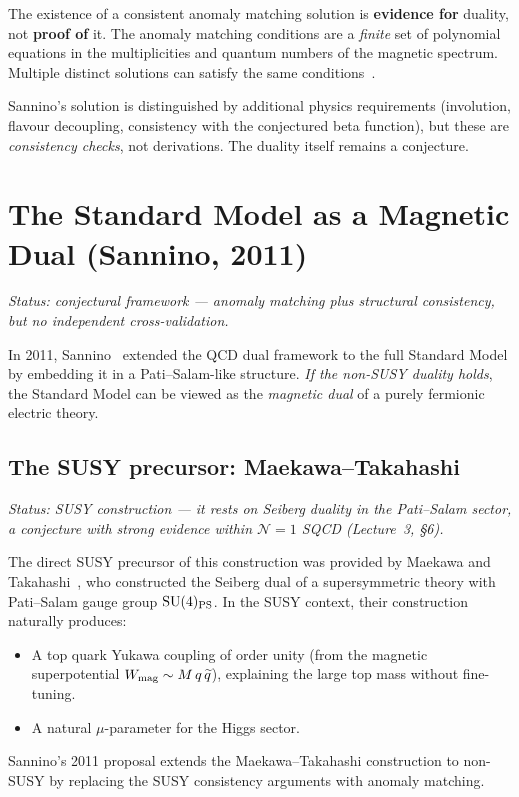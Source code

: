 \documentclass[11pt,a4paper]{article}
\begin{document}
\begin{warningbox}[title={Anomaly matching is necessary but not sufficient}]
  The existence of a consistent anomaly matching solution is
  \textbf{evidence for} duality, not \textbf{proof of} it.  The
  anomaly matching conditions are a \emph{finite} set of polynomial
  equations in the multiplicities and quantum numbers of the magnetic
  spectrum.  Multiple distinct solutions can satisfy the same
  conditions~\cite{Sannino2009}.

  \medskip

  Sannino's solution is distinguished by additional
  physics requirements (involution, flavour decoupling, consistency
  with the conjectured beta function), but these are
  \emph{consistency checks}, not derivations.  The duality itself
  remains a conjecture.
\end{warningbox}


\section{The Standard Model as a Magnetic Dual (Sannino, 2011)}
\label{sec:sm-magnetic}

\textit{Status: conjectural framework --- anomaly matching plus structural consistency, but no independent cross-validation.}

In 2011, Sannino~\cite{Sannino2011} extended the QCD dual framework
to the full Standard Model by embedding it in a Pati--Salam-like
structure.  \emph{If the non-SUSY duality holds}, the Standard Model
can be viewed as the \emph{magnetic dual} of a purely fermionic
electric theory.

\subsection{The SUSY precursor: Maekawa--Takahashi}

\textit{Status: SUSY construction --- it rests on Seiberg duality in the Pati--Salam sector, a conjecture with strong evidence within $\mathcal{N}=1$ SQCD (Lecture~3, \S6).}

The direct SUSY precursor of this construction was provided by
Maekawa and Takahashi~\cite{MT1996}, who constructed the Seiberg dual
of a supersymmetric theory with Pati--Salam gauge group
$\mathrm{SU}(4)_{\mathrm{PS}}$.  In the SUSY context, their construction
naturally produces:
\begin{itemize}
  \item A top quark Yukawa coupling of order unity (from the magnetic
    superpotential $W_{\mathrm{mag}} \sim M\,q\,\widetilde{q}$),
    explaining the large top mass without fine-tuning.
  \item A natural $\mu$-parameter for the Higgs sector.
\end{itemize}
Sannino's 2011 proposal extends the Maekawa--Takahashi construction
to non-SUSY by replacing the SUSY consistency arguments with anomaly
matching.
\end{document}
